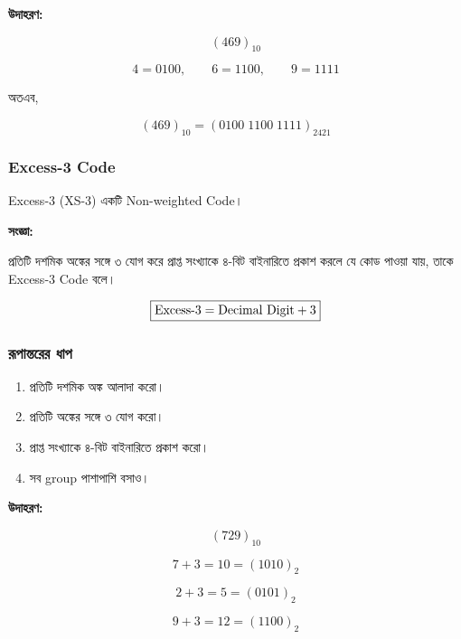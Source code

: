 \textbf{\textcolor{ICTOrange}{উদাহরণ:}}

\[
(469)_{10}
\]

\[
4=0100,\qquad
6=1100,\qquad
9=1111
\]

অতএব,

\[
\boxed{
(469)_{10}
=
(0100\;1100\;1111)_{2421}
}
\]


\subsubsection*{\textenglish{Excess-3 Code}}

\textenglish{Excess-3 (XS-3)} একটি
\textenglish{Non-weighted Code}।

\par\begingroup

\textbf{সংজ্ঞা:}

প্রতিটি দশমিক অঙ্কের সঙ্গে ৩ যোগ করে প্রাপ্ত সংখ্যাকে
৪-বিট বাইনারিতে প্রকাশ করলে যে কোড পাওয়া যায়,
তাকে \textenglish{Excess-3 Code} বলে।
\par\endgroup


\[
\boxed{
\text{\textenglish{Excess-3}}
=
\text{\textenglish{Decimal Digit}}+3
}
\]

\subsubsection*{রূপান্তরের ধাপ}

\par\begingroup

\begin{enumerate}
    \item প্রতিটি দশমিক অঙ্ক আলাদা করো।
    \item প্রতিটি অঙ্কের সঙ্গে ৩ যোগ করো।
    \item প্রাপ্ত সংখ্যাকে ৪-বিট বাইনারিতে প্রকাশ করো।
    \item সব \textenglish{group} পাশাপাশি বসাও।
\end{enumerate}
\par\endgroup


\textbf{\textcolor{ICTOrange}{উদাহরণ:}}

\[
(729)_{10}
\]

\[
7+3=10=(1010)_2
\]

\[
2+3=5=(0101)_2
\]

\[
9+3=12=(1100)_2
\]

